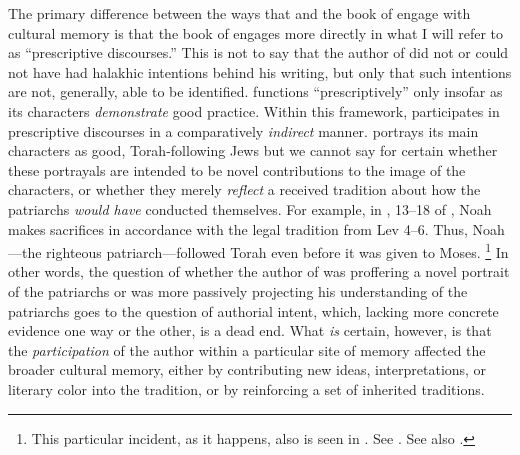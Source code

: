The primary difference between the ways that \ga and the book of \jub engage with cultural memory is that the book of \jub engages more directly in what I will refer to as ``prescriptive discourses.'' This is not to say that the author of \ga did not or could not have had halakhic intentions behind his writing, but only that such intentions are not, generally, able to be identified. \GA functions ``prescriptively'' only insofar as its characters \emph{demonstrate} good practice. Within this framework, \ga participates in prescriptive discourses in a comparatively \emph{indirect} manner. \GA portrays its main characters as good, Torah-following Jews but we cannot say for certain whether these portrayals are intended to be novel contributions to the image of the characters, or whether they merely \emph{reflect} a received tradition about how the patriarchs \emph{would have} conducted themselves. For example, in , 13--18 of \ga, Noah makes sacrifices in accordance with the legal tradition from Lev 4--6. Thus, Noah---the righteous patriarch---followed Torah even before it was given to Moses.%
    \footnote{%
        This particular incident, as it happens, also is seen in \jub. See
        \cite[112]{crawford2008}. See also 
        \cite[419]{reeves_revq1986}.}
In other words, the question of whether the author of \ga was proffering a novel portrait of the patriarchs or was more passively projecting his understanding of the patriarchs goes to the question of authorial intent, which, lacking more concrete evidence one way or the other, is a dead end. What \emph{is} certain, however, is that the \emph{participation} of the author within a particular site of memory affected the broader cultural memory, either by contributing new ideas, interpretations, or literary color into the tradition, or by reinforcing a set of inherited traditions.

